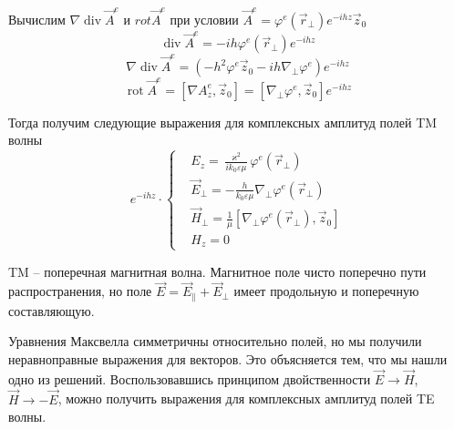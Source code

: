 \documentclass[a4paper,14pt]{extarticle}
\DeclareMathOperator{\Div}{div}
\DeclareMathOperator{\Rot}{rot}
\renewcommand{\phi}{\varphi}
\renewcommand{\epsilon}{\varepsilon}
\renewcommand{\kappa}{\varkappa}
\begin{document}
	Вычислим $\nabla \Div \vec{A}^e$ и $rot \vec{A}^e$ при условии $\vec{A}^e = \phi^e(\vec{r}_\perp)e^{-ihz}\vec{z}_0$
\begin{equation}
	\Div \vec{A}^e = -ih\phi^e(\vec{r}_\perp)e^{-ihz}
\end{equation}
\begin{equation}
	\nabla \Div \vec{A}^e = (-h^2\phi^e\vec{z}_0-ih\nabla_\perp\phi^e)e^{-ihz}
\end{equation}
\begin{equation}
	\Rot \vec{A}^e = [\nabla A^e_z,\vec{z}_0] = [\nabla_\perp\phi^e,\vec{z}_0]e^{-ihz}
\end{equation}
	
Тогда получим следующие выражения для комплексных амплитуд полей TM волны 
\begin{equation}
	e^{-ihz}\cdot\left\{
	\begin{aligned}
		&E_z = \frac{\kappa^2}{ik_0\epsilon\mu}\phi^e(\vec{r}_\perp)\\
		&\vec{E}_\perp = -\frac{h}{k_0\epsilon\mu}\nabla_\perp\phi^e(\vec{r}_\perp)\\
		&\vec{H}_\perp = \frac{1}{\mu}[\nabla_\perp\phi^e(\vec{r}_\perp),\vec{z}_0]\\
		&H_z = 0
	\end{aligned}\right.
\end{equation}


TM -- поперечная магнитная волна. Магнитное поле чисто поперечно пути распространения, но поле $\vec{E}=\vec{E}_\parallel+\vec{E}_\perp$ имеет продольную и поперечную составляющую.

Уравнения Максвелла симметричны относительно полей, но мы получили неравноправные выражения для векторов. Это объясняется тем, что мы нашли одно из решений. Воспользовавшись принципом двойственности $\vec{E}\to\vec{H}$, $\vec{H}\to -\vec{E}$, можно получить выражения  для комплексных амплитуд полей TE волны. 
\end{document}
